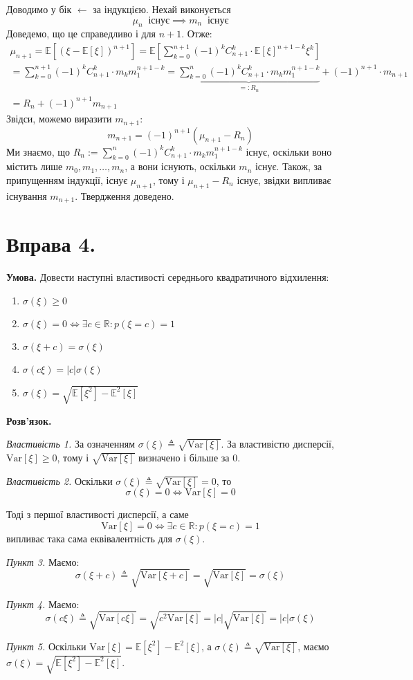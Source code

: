 \documentclass[14pt]{extarticle}
\begin{document}
Доводимо у бік $\leftarrow$ за індукцією. Нехай виконується
\[
\mu_n \; \; \text{існує} \implies m_n \; \; \text{існує}
\]
Доведемо, що це справедливо і для $n+1$. Отже:
\begin{align*}
\mu_{n+1} = \mathbb{E}[(\xi-\mathbb{E}[\xi])^{n+1}] = \mathbb{E}\left[\sum_{k=0}^{n+1} (-1)^k C_{n+1}^k \cdot \mathbb{E}[\xi]^{n+1-k}\xi^{k}\right] \\
= \sum_{k=0}^{n+1} (-1)^k C_{n+1}^k \cdot m_km_1^{n+1-k} = \underbrace{\sum_{k=0}^n (-1)^kC_{n+1}^k \cdot m_k m_1^{n+1-k}}_{=: R_n} + (-1)^{n+1} \cdot m_{n+1} \\
= R_n + (-1)^{n+1}m_{n+1}
\end{align*}
Звідси, можемо виразити $m_{n+1}$:
\[
m_{n+1} = (-1)^{n+1}(\mu_{n+1}-R_n)
\]
Ми знаємо, що $R_n:=\sum_{k=0}^n (-1)^kC_{n+1}^k \cdot m_k m_1^{n+1-k}$ існує, оскільки воно містить лише $m_0,m_1,\dots,m_n$, а вони існують, оскільки $m_n$ існує. Також, за припущенням індукції, існує $\mu_{n+1}$, тому і $\mu_{n+1}-R_n$ існує, звідки випливає існування $m_{n+1}$. Твердження доведено.
\pagebreak
\section*{Вправа 4.}

\textbf{Умова.} Довести наступні властивості середнього квадратичного відхилення:
\begin{enumerate}
    \item $\sigma(\xi) \geq 0$
    \item $\sigma(\xi) = 0 \iff \exists c \in \mathbb{R}: p(\xi=c)=1$
    \item $\sigma(\xi+c)=\sigma(\xi)$
    \item $\sigma(c\xi) = |c|\sigma(\xi)$
    \item $\sigma(\xi) = \sqrt{\mathbb{E}[\xi^2] - \mathbb{E}^2[\xi]}$
\end{enumerate}

\textbf{Розв'язок.} 

\textit{Властивість 1.} За означенням $\sigma(\xi) \triangleq \sqrt{\text{Var}[\xi]}$. За властивістю дисперсії, $\text{Var}[\xi] \geq 0$, тому і $\sqrt{\text{Var}[\xi]}$ визначено і більше за $0$.

\textit{Властивість 2.} Оскільки $\sigma(\xi) \triangleq \sqrt{\text{Var}[\xi]}=0$, то
\[
\sigma(\xi) = 0 \iff \text{Var}[\xi] = 0
\]

Тоді з першої властивості дисперсії, а саме
\[
\text{Var}[\xi] = 0 \iff \exists c \in \mathbb{R}: p(\xi=c)=1
\]
випливає така сама еквівалентність для $\sigma(\xi)$.

\textit{Пункт 3.} Маємо:
\[
\sigma(\xi+c) \triangleq \sqrt{\text{Var}[\xi+c]} = \sqrt{\text{Var}[\xi]} = \sigma(\xi)
\]

\textit{Пункт 4.} Маємо:
\[
\sigma(c\xi) \triangleq \sqrt{\text{Var}[c\xi]} = \sqrt{c^2\text{Var}[\xi]} = |c|\sqrt{\text{Var}[\xi]} = |c|\sigma(\xi)
\]

\textit{Пункт 5.} Оскільки $\text{Var}[\xi] = \mathbb{E}[\xi^2] - \mathbb{E}^2[\xi]$, а $\sigma(\xi) \triangleq \sqrt{\text{Var}[\xi]}$, маємо $\sigma(\xi) = \sqrt{\mathbb{E}[\xi^2] - \mathbb{E}^2[\xi]}$.
\end{document}
